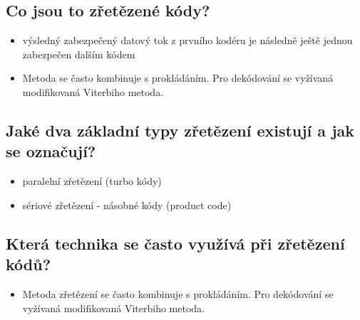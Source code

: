 \subsection{Co jsou to zřetězené kódy?}
\begin{itemize}
    \item výsledný zabezpečený datový tok z prvního kodéru je následně ještě jednou zabezpečen dalším kódem
    \item  Metoda se často kombinuje s prokládáním. Pro dekódování se vyžívaná modifikovaná Viterbiho metoda.
\end{itemize}

\subsection{Jaké dva základní typy zřetězení existují a jak se označují?}
\begin{itemize}
    \item paralelní zřetězení (turbo kódy)
    \item sériové zřetězení - násobné kódy (product code)
\end{itemize}

\subsection{Která technika se často využívá při zřetězení kódů?}
\begin{itemize}
    \item Metoda zřetězení se často kombinuje s prokládáním. Pro dekódování se vyžívaná modifikovaná Viterbiho metoda.
\end{itemize}

